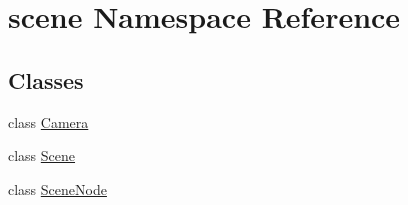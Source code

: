 \hypertarget{namespacescene}{\section{scene Namespace Reference}
\label{namespacescene}
}
\subsection*{Classes}
\begin{DoxyCompactItemize}
\item 
class \hyperlink{classscene_1_1Camera}{Camera}
\item 
class \hyperlink{classscene_1_1Scene}{Scene}
\item 
class \hyperlink{classscene_1_1SceneNode}{Scene\-Node}
\end{DoxyCompactItemize}
